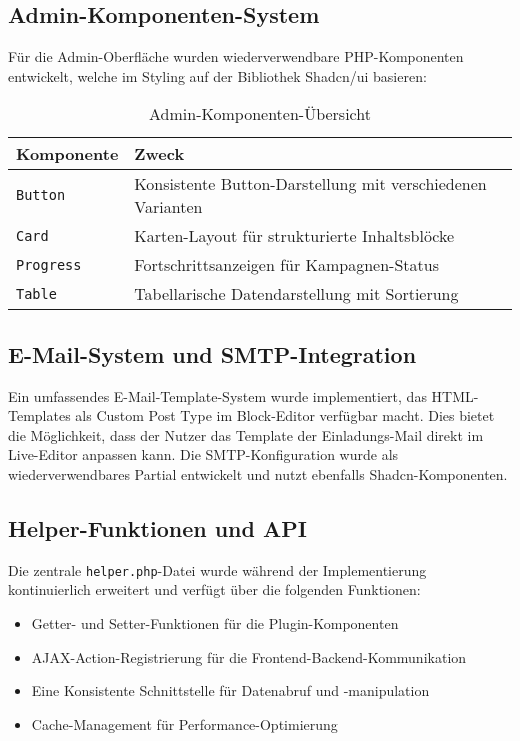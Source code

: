 \subsection{Admin-Komponenten-System}
Für die Admin-Oberfläche wurden wiederverwendbare PHP-Komponenten entwickelt, welche im Styling auf der Bibliothek Shadcn/ui basieren:

\begin{table}[H]
    \centering
    \begin{tabular}{|l|p{8cm}|}
        \hline
        \textbf{Komponente} & \textbf{Zweck} \\
        \hline
        \texttt{Button} & Konsistente Button-Darstellung mit verschiedenen Varianten \\
        \texttt{Card} & Karten-Layout für strukturierte Inhaltsblöcke \\
        \texttt{Progress} & Fortschrittsanzeigen für Kampagnen-Status \\
        \texttt{Table} & Tabellarische Datendarstellung mit Sortierung \\
        \hline
    \end{tabular}
    \caption{Admin-Komponenten-Übersicht}
    \label{tab:admin-components}
\end{table}

\subsection{E-Mail-System und SMTP-Integration}
Ein umfassendes E-Mail-Template-System wurde implementiert, das HTML-Templates als Custom Post Type im Block-Editor verfügbar macht.
Dies bietet die Möglichkeit, dass der Nutzer das Template der Einladungs-Mail direkt im Live-Editor anpassen kann.
Die SMTP-Konfiguration wurde als wiederverwendbares Partial entwickelt und nutzt ebenfalls Shadcn-Komponenten.

\subsection{Helper-Funktionen und API}
Die zentrale \texttt{helper.php}-Datei wurde während der Implementierung kontinuierlich erweitert und verfügt über die folgenden Funktionen:

\begin{itemize}
    \item Getter- und Setter-Funktionen für die Plugin-Komponenten
    \item AJAX-Action-Registrierung für die Frontend-Backend-Kommunikation
    \item Eine Konsistente Schnittstelle für Datenabruf und -manipulation
    \item Cache-Management für Performance-Optimierung
\end{itemize}


